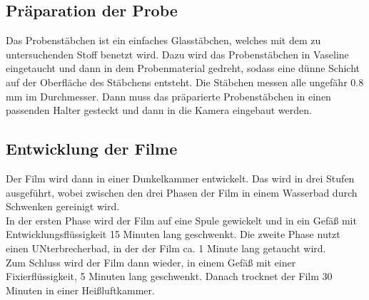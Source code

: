 \subsection{Präparation der Probe}
Das Probenstäbchen ist ein einfaches Glasstäbchen, welches mit dem zu untersuchenden Stoff benetzt wird.
Dazu wird das Probenstäbchen in Vaseline eingetaucht und dann in dem Probenmaterial gedreht, sodass eine dünne Schicht auf der Oberfläche des Stäbchens entsteht. 
Die Stäbchen messen alle ungefähr 0.8 \si{\milli \meter} im Durchmesser.
Dann muss das präparierte Probenstäbchen in einen passenden Halter gesteckt und dann in die Kamera eingebaut werden.

\subsection{Entwicklung der Filme}
Der Film wird dann in einer Dunkelkammer entwickelt. 
Das wird in drei Stufen ausgeführt, wobei zwischen den drei Phasen der Film in einem Wasserbad durch Schwenken gereinigt wird.\\
In der ersten Phase wird der Film auf eine Spule gewickelt und in ein Gefäß mit Entwicklungsflüssigkeit 15 Minuten lang geschwenkt.
Die zweite Phase nutzt einen UNterbrecherbad, in der der Film ca. 1 Minute lang getaucht wird. \\
Zum Schluss wird der Film dann wieder, in einem Gefäß mit einer Fixierflüssigkeit, 5 Minuten lang geschwenkt.
Danach trocknet der Film 30 Minuten in einer Heißluftkammer.
 







